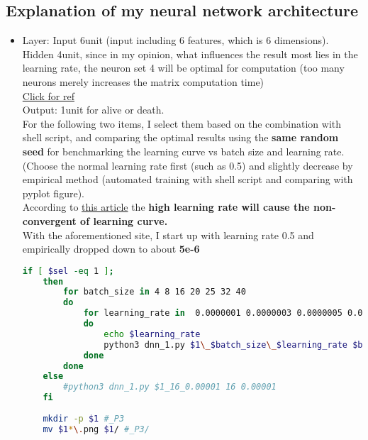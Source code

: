 \documentclass[11pt, a4paper]{article} %
\begin{document}
\subsection{Explanation of my neural network architecture} %
\begin{itemize}
    \item Layer: Input 6unit (input including 6 features, which is 6 dimensions). 
    \\ Hidden 4unit, since in my opinion, what influences the result most lies in the learning rate, the neuron set 4 will be optimal for computation (too many neurons merely increases the matrix computation time) 
    \\ \href{https://stats.stackexchange.com/questions/181/how-to-choose-the-number-of-hidden-layers-and-nodes-in-a-feedforward-neural-netw}{Click for ref}
    \\ Output: 1unit for alive or death.
    \\ For the following two items, I select them based on the combination with shell script, and comparing the optimal results using the \textbf{same random seed} for benchmarking the learning curve vs batch size and learning rate. (Choose the normal learning rate first (such as 0.5) and slightly decrease by empirical method (automated training with shell script and comparing with pyplot figure).
    \\ According to \href{https://medium.com/@chih.sheng.huang821/機器學習-基礎數學-三-梯度最佳解相關算法-gradient-descent-optimization-algorithms-b61ed1478bd7}{this article} the \textbf{high learning rate will cause the non-convergent of learning curve.}
    \\ With the aforementioned site, I start up with learning rate 0.5 and empirically dropped down to about \textbf{5e-6}
    
    
    \begin{lstlisting}[language = bash]
    if [ $sel -eq 1 ];
    then
        for batch_size in 4 8 16 20 25 32 40
        do
            for learning_rate in  0.0000001 0.0000003 0.0000005 0.000001 0.000003 0.000005
            do
                echo $learning_rate
                python3 dnn_1.py $1\_$batch_size\_$learning_rate $batch_size $learning_rate
            done
        done
    else
        #python3 dnn_1.py $1_16_0.00001 16 0.00001
    fi
    
    mkdir -p $1 #_P3
    mv $1*\.png $1/ #_P3/
    \end{lstlisting}
     

\end{itemize}
\end{document}
